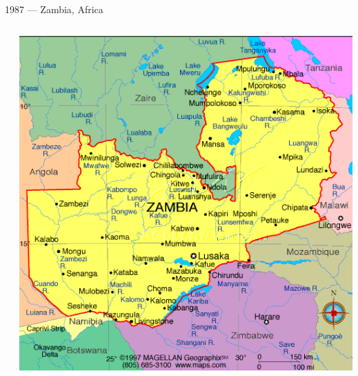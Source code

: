 \documentclass[t,xcolor={usenames,dvipsnames}]{beamer}
\begin{document}
\begin{frame}{1987 --- Zambia, Africa}
\begin{columns}[T]
\begin{center}
\end{center}
\begin{center}
\includegraphics[width=.85\textwidth]{zambia}\\
\end{center}
\end{columns}
\end{frame}
\end{document}
